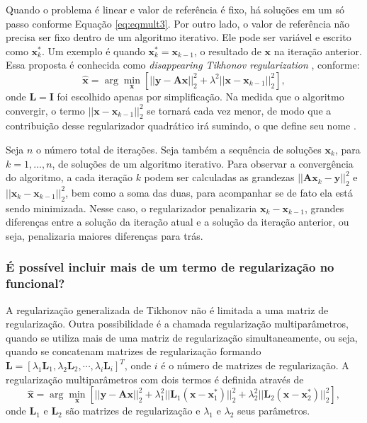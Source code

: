Quando o problema é linear e valor de referência é fixo, há soluções em um só passo conforme Equação \eqref{eq:eqmult3}. Por outro lado, o valor de referência não precisa ser fixo dentro de um algoritmo iterativo. Ele pode ser variável e escrito como $\mathbf{x}_k^*$. Um exemplo é quando $\mathbf{x}_k^* = \mathbf{x}_{k-1}$, o resultado de $\mathbf{x}$ na iteração anterior. Essa proposta é conhecida como \textit{disappearing Tikhonov regularization} \cite[pág. 143]{Parikh2014}, conforme:
\begin{equation}
\hat{\mathbf{x}} = \arg\min\limits_{\mathbf{x}} \left[ \vert \vert \mathbf{y}- \mathbf{A} \mathbf{x} \vert \vert^2_2 + \lambda^2 \vert \vert \mathbf{x} - \mathbf{x}_{k-1} \vert \vert^2_2 \right],
\label{eq:eqmult53}
\end{equation}
onde $\mathbf{L} = \mathbf{I}$ foi escolhido apenas por simplificação. Na medida que o algoritmo convergir, o termo $\vert \vert \mathbf{x} - \mathbf{x}_{k-1} \vert \vert^2_2$ se tornará cada vez menor, de modo que a contribuição desse regularizador quadrático irá sumindo, o que define seu nome \cite[pág. 143]{Parikh2014}.

Seja $n$ o número total de iterações. Seja também a sequência de soluções $\mathbf{x}_k$, para $k = 1, \dots, n$, de soluções de um algoritmo iterativo. Para observar a convergência do algoritmo, a cada iteração $k$ podem ser calculadas as grandezas $\vert \vert \mathbf{A} \mathbf{x}_k - \mathbf{y}\vert \vert_2^2$ e $\vert \vert \mathbf{x}_k - \mathbf{x}_{k-1} \vert \vert^2_2$, bem como a soma das duas, para acompanhar se de fato ela está sendo minimizada. Nesse caso, o regularizador penalizaria $\mathbf{x}_k - \mathbf{x}_{k-1}$, grandes diferenças entre a solução da iteração atual e a solução da iteração anterior, ou seja, penalizaria maiores diferenças para trás. 

\subsubsection{É possível incluir mais de um termo de regularização no funcional?}
A regularização generalizada de Tikhonov não é limitada a uma matriz de regularização. Outra possibilidade é a chamada regularização multiparâmetros, quando se utiliza mais de uma matriz de regularização simultaneamente, ou seja, quando se concatenam matrizes de regularização formando $\mathbf{L} = \left[ \lambda_1 \mathbf{L}_{1}, \lambda_2 \mathbf{L}_{2}, \cdots, \lambda_i \mathbf{L}_{i}\right]^T$, onde $i$ é o número de matrizes de regularização. A regularização multiparâmetros com dois termos é definida através de
\begin{equation}
\hat{\mathbf{x}} = \arg\min\limits_{\mathbf{x}} \left[ \vert \vert \mathbf{y} - \mathbf{A} \mathbf{x} \vert \vert^2_2 
+  \lambda^2_1 \vert \vert \mathbf{L}_{1} \left(\mathbf{x} - \mathbf{x}^*_1\right) \vert \vert^2_2
+  \lambda^2_2 \vert \vert \mathbf{L}_{2} \left(\mathbf{x} - \mathbf{x}^*_2\right) \vert \vert^2_2 \right],
\label{eq:eqmult1}
\end{equation}
onde $\mathbf{L}_1$ e $\mathbf{L}_2$ são matrizes de regularização e $\lambda_1$ e $\lambda_2$ seus parâmetros. 

